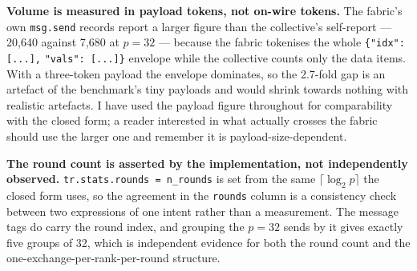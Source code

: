 \documentclass[11pt]{article}
\begin{document}
\textbf{Volume is measured in payload tokens, not on-wire tokens.} The fabric's own
\texttt{msg.send} records report a larger figure than the collective's self-report --- 20,640
against 7,680 at $p=32$ --- because the fabric tokenises the whole \verb|{"idx": [...],|
\verb|"vals": [...]}| envelope while the collective counts only the data items. With a
three-token payload the envelope dominates, so the 2.7-fold gap is an artefact of the
benchmark's tiny payloads and would shrink towards nothing with realistic artefacts. I have
used the payload figure throughout for comparability with the closed form; a reader interested
in what actually crosses the fabric should use the larger one and remember it is
payload-size-dependent.

\textbf{The round count is asserted by the implementation, not independently observed.}
\texttt{tr.stats.rounds = n\_rounds} is set from the same $\lceil\log_2 p\rceil$ the closed
form uses, so the agreement in the \texttt{rounds} column is a consistency check between two
expressions of one intent rather than a measurement. The message tags do carry the round index, and
grouping the $p=32$ sends by it gives exactly five groups of 32, which is independent evidence
for both the round count and the one-exchange-per-rank-per-round structure.
\end{document}
